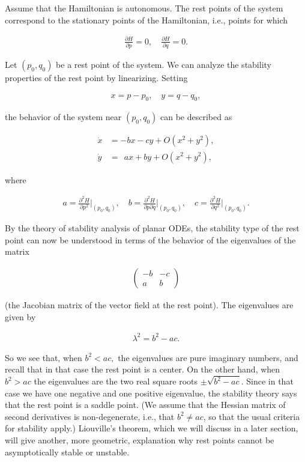 \documentclass[11pt]{report}
\theoremstyle{plain}
\theoremstyle{definition}
\begin{document}
Assume that the Hamiltonian is autonomous. The rest
points of the system correspond to the stationary
points of the Hamiltonian, i.e., points for which

\begin{align*}
\frac{\partial H}{\partial p} = 0, \quad \frac{\partial H}{\partial q} = 0.
\end{align*}

\noindent Let $(p_0,q_0)$ be a rest point of the system. We can
analyze the stability properties of the rest point by
linearizing. Setting

\begin{align*}
x = p-p_0, \quad y=q-q_0,
\end{align*}

\noindent the behavior of the system near $(p_0,q_0)$ can be
described as

\begin{align*}
\dot{x} &= -bx-cy + O(x^2+y^2), \\ \dot{y}&= \ \ ax+by + O(x^2+y^2),
\end{align*}

\noindent where

\begin{align*}
a = \frac{\partial^2 H}{\partial p^2} \Big|_{(p_0,q_0)},\quad
b = \frac{\partial^2 H}{\partial p \partial q} \Big|_{(p_0,q_0)}, \quad
c = \frac{\partial^2 H}{\partial q^2} \Big|_{(p_0,q_0)}.
\end{align*}

\noindent By the theory of stability analysis of planar ODEs,
the stability type of the rest point can now be
understood in terms of the behavior of the eigenvalues
of the matrix

\begin{align*}
\left(\begin{array}{cc} -b&-c\\a&b\end{array}\right)
\end{align*}

\noindent (the Jacobian matrix of the vector field at the rest
point). The eigenvalues are given by

\begin{align*}
\lambda^2 = b^2-ac.
\end{align*}

\noindent So we see that, when $b^2<ac,$ the eigenvalues are
pure imaginary numbers, and recall that in that case
the rest point is a center. On the other hand, when
$b^2>ac$ the eigenvalues are the two real square roots
$\pm \sqrt{b^2-ac}$. Since in that case we have one
negative and one positive eigenvalue, the stability
theory says that the rest point is a saddle point. (We
assume that the Hessian matrix of second derivatives
is non-degenerate, i.e., that $b^2\neq ac$, so that
the usual criteria for stability apply.) Liouville's
theorem, which we will discuss in a later section,
will give another, more geometric, explanation why
rest points cannot be asymptotically stable or
unstable.
\end{document}
